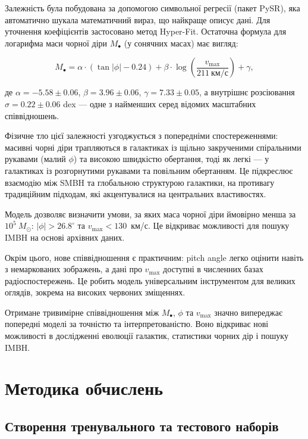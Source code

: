\documentclass[14pt,a4paper,titlepage,oneside]{book}
\numberwithin{equation}{part}
\begin{document}
Залежність була побудована за допомогою символьної регресії (пакет PySR), яка автоматично шукала математичний вираз, що найкраще описує дані. Для уточнення коефіцієнтів застосовано метод Hyper-Fit. Остаточна формула для логарифма маси чорної діри $M_\bullet$ (у сонячних масах) має вигляд:

\[
M_\bullet = \alpha \cdot (\tan|\phi| - 0.24) + \beta \cdot \log\left(\frac{v_\text{max}}{211~\text{км/с}}\right) + \gamma,
\]

де $\alpha = -5.58 \pm 0.06$, $\beta = 3.96 \pm 0.06$, $\gamma = 7.33 \pm 0.05$, а внутрішнє розсіювання $\sigma = 0.22 \pm 0.06$ dex — одне з найменших серед відомих масштабних співвідношень.

Фізичне тло цієї залежності узгоджується з попередніми спостереженнями: масивні чорні діри трапляються в галактиках із щільно закрученими спіральними рукавами (малий $\phi$) та високою швидкістю обертання, тоді як легкі — у галактиках із розгорнутими рукавами та повільним обертанням. Це підкреслює взаємодію між SMBH та глобальною структурою галактики, на противагу традиційним підходам, які акцентувалися на центральних властивостях.

Модель дозволяє визначити умови, за яких маса чорної діри ймовірно менша за $10^5~M_\odot$: $|\phi| > 26.8^\circ$ та $v_\text{max} < 130$~км/с. Це відкриває можливості для пошуку IMBH на основі архівних даних.

Окрім цього, нове співвідношення є практичним: pitch angle легко оцінити навіть з немаркованих зображень, а дані про $v_\text{max}$ доступні в численних базах радіоспостережень. Це робить модель універсальним інструментом для великих оглядів, зокрема на високих червоних зміщеннях.

Отримане тривимірне співвідношення між $M_\bullet$, $\phi$ та $v_\text{max}$ значно випереджає попередні моделі за точністю та інтерпретованістю. Воно відкриває нові можливості в дослідженні еволюції галактик, статистики чорних дір і пошуку IMBH.



\chapter[Методика обчислень]{Методика обчислень}


\section{Створення тренувального та тестового наборів}
\end{document}
